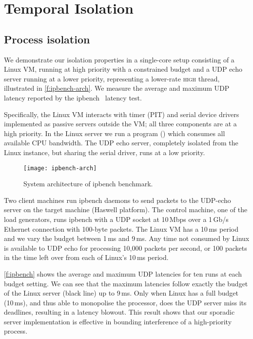 
\section{Temporal Isolation}

\subsection{Process isolation} 
We demonstrate our isolation properties
in a single-core setup consisting of a Linux VM,
running at high priority with a
constrained budget and a UDP echo server running at a lower priority,
representing a lower-rate \textsc{high} thread, illustrated in \autoref{f:ipbench-arch}. We
measure the average  and maximum UDP latency reported by the
ipbench~\citep{Wienand_Macpherson_04} latency test.

Specifically, the Linux VM interacts with timer (PIT) and serial device drivers implemented as
passive servers outside the VM; all three components are at a high priority. In the Linux server we
run a program () which consumes all available
CPU bandwidth.  The UDP echo server, completely isolated from the Linux instance, but sharing the serial driver,
runs at a low priority.

\begin{figure}[t]
    \centering
    \texttt{[image: ipbench-arch]}
    \caption{System architecture of ipbench benchmark.}
    \label{f:ipbench-arch}
\end{figure}

Two client machines run ipbench daemons to send packets to the UDP-echo server on the target machine
(Haswell platform). The control machine, one of the load generators, runs ipbench with a \gls{UDP} socket at 10\,Mbps over a 1\,Gb/s Ethernet connection with 100-byte packets. The Linux VM has a 10\,ms period and we vary the
budget between 1\,ms and 9\,ms.
Any time not consumed by Linux is available to UDP echo for processing
10,000 packets per second, or 100 packets in the time left over from
each of Linux's 10\,ms period.

\autoref{f:ipbench} shows the average and maximum UDP latencies for
ten runs at each budget setting. We can see that the maximum latencies
follow exactly the budget of the Linux server (black line) up to 9\,ms. Only
when Linux has a full budget (10\,ms), and thus able to monopolise the
processor, does the UDP server miss its deadlines, resulting in a
latency blowout.  This result shows that our sporadic server implementation is effective in bounding interference of a high-priority process.


